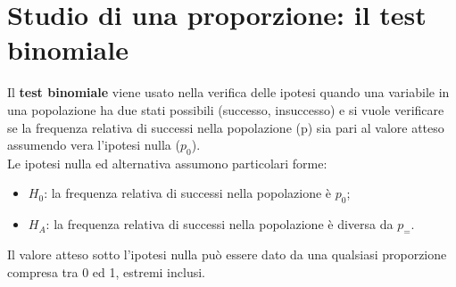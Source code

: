 \documentclass[10pt, draft]{book}
\begin{document}
\section{Studio di una proporzione: il test binomiale}

Il \textbf{test binomiale} viene usato nella verifica delle ipotesi quando una variabile in una popolazione ha due stati possibili (successo, insuccesso) e si vuole verificare se la frequenza relativa di successi nella popolazione (p) sia pari al valore atteso assumendo vera l'ipotesi nulla ($p_0$).
\\
Le ipotesi nulla ed alternativa assumono particolari forme:
\begin{itemize}
\item $H_0$: la frequenza relativa di successi nella popolazione è $p_0$;
\item $H_A$: la frequenza relativa di successi nella popolazione è diversa da $p_=$.
\end{itemize}
Il valore atteso sotto l'ipotesi nulla può essere dato da una qualsiasi proporzione compresa tra 0 ed 1, estremi inclusi.
\end{document}
